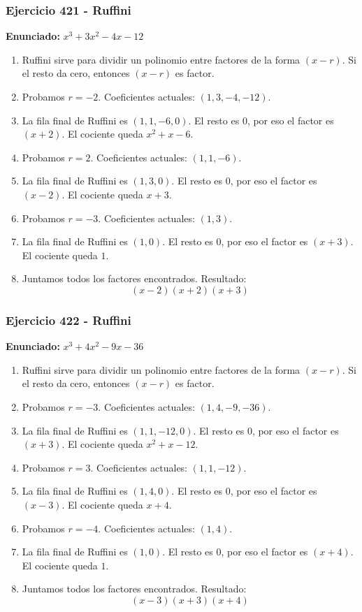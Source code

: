 \documentclass[11pt,a4paper]{article}
\begin{document}
\subsubsection*{Ejercicio 421 - Ruffini}
\textbf{Enunciado:} $ x^{3} + 3 x^{2} - 4 x - 12 $\par
\begin{enumerate}[leftmargin=2em]
\item Ruffini sirve para dividir un polinomio entre factores de la forma \((x-r)\). Si el resto da cero, entonces \((x-r)\) es factor.
\item Probamos \(r=-2\). Coeficientes actuales: \((1, 3, -4, -12)\).
\item La fila final de Ruffini es \((1, 1, -6, 0)\). El resto es \(0\), por eso el factor es \((x+2)\). El cociente queda \(x^{2} + x - 6\).
\item Probamos \(r=2\). Coeficientes actuales: \((1, 1, -6)\).
\item La fila final de Ruffini es \((1, 3, 0)\). El resto es \(0\), por eso el factor es \((x-2)\). El cociente queda \(x + 3\).
\item Probamos \(r=-3\). Coeficientes actuales: \((1, 3)\).
\item La fila final de Ruffini es \((1, 0)\). El resto es \(0\), por eso el factor es \((x+3)\). El cociente queda \(1\).
\item Juntamos todos los factores encontrados. Resultado: \[\boxed{\left(x - 2\right) \left(x + 2\right) \left(x + 3\right)}\]
\end{enumerate}

\vspace{0.2cm}
\subsubsection*{Ejercicio 422 - Ruffini}
\textbf{Enunciado:} $ x^{3} + 4 x^{2} - 9 x - 36 $\par
\begin{enumerate}[leftmargin=2em]
\item Ruffini sirve para dividir un polinomio entre factores de la forma \((x-r)\). Si el resto da cero, entonces \((x-r)\) es factor.
\item Probamos \(r=-3\). Coeficientes actuales: \((1, 4, -9, -36)\).
\item La fila final de Ruffini es \((1, 1, -12, 0)\). El resto es \(0\), por eso el factor es \((x+3)\). El cociente queda \(x^{2} + x - 12\).
\item Probamos \(r=3\). Coeficientes actuales: \((1, 1, -12)\).
\item La fila final de Ruffini es \((1, 4, 0)\). El resto es \(0\), por eso el factor es \((x-3)\). El cociente queda \(x + 4\).
\item Probamos \(r=-4\). Coeficientes actuales: \((1, 4)\).
\item La fila final de Ruffini es \((1, 0)\). El resto es \(0\), por eso el factor es \((x+4)\). El cociente queda \(1\).
\item Juntamos todos los factores encontrados. Resultado: \[\boxed{\left(x - 3\right) \left(x + 3\right) \left(x + 4\right)}\]
\end{enumerate}
\end{document}

